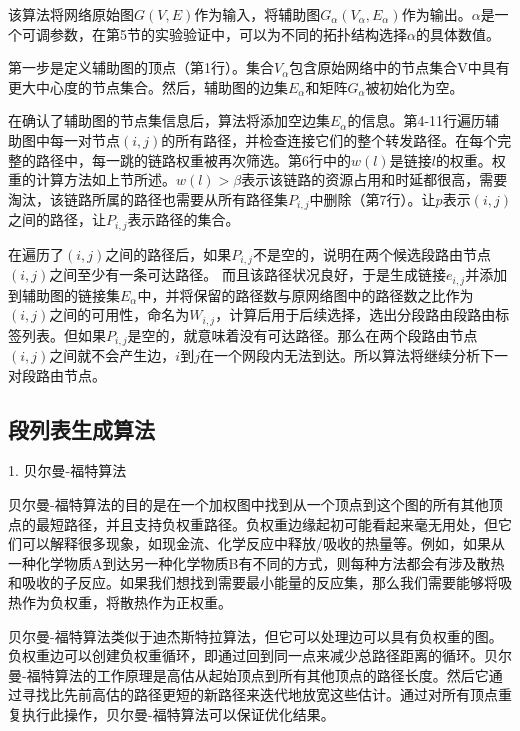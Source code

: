 该算法将网络原始图$G(V, E)$作为输入，将辅助图$G_\alpha\left(V_\alpha,E_\alpha\right)$作为输出。$\alpha$是一个可调参数，在第5节的实验验证中，可以为不同的拓扑结构选择$\alpha$的具体数值。

第一步是定义辅助图的顶点（第1行）。集合$V_\alpha$包含原始网络中的节点集合V中具有更大中心度的节点集合。然后，辅助图的边集$E_\alpha$和矩阵$G_\alpha$被初始化为空。

在确认了辅助图的节点集信息后，算法将添加空边集$E_\alpha$的信息。第4-11行遍历辅助图中每一对节点$\left(i,j\right)$的所有路径，并检查连接它们的整个转发路径。在每个完整的路径中，每一跳的链路权重被再次筛选。第6行中的$w\left(l\right)$是链接$l$的权重。权重的计算方法如上节所述。$w\left(l\right)>\beta$表示该链路的资源占用和时延都很高，需要淘汰，该链路所属的路径也需要从所有路径集$P_{i,j}$中删除（第7行）。让$p$表示$\left(i,j\right)$之间的路径，让$P_{i,j}$表示路径的集合。

在遍历了$\left(i,j\right)$之间的路径后，如果$P_{i,j}$不是空的，说明在两个候选段路由节点$\left(i,j\right)$之间至少有一条可达路径。 而且该路径状况良好，于是生成链接$e_{i,j}$并添加到辅助图的链接集$E_\alpha$中，并将保留的路径数与原网络图中的路径数之比作为$\left(i,j\right)$之间的可用性，命名为$W_{i,j}$，计算后用于后续选择，选出分段路由段路由标签列表。但如果$P_{i,j}$是空的，就意味着没有可达路径。那么在两个段路由节点$\left(i,j\right)$之间就不会产生边，$i$到$j$在一个网段内无法到达。所以算法将继续分析下一对段路由节点。

\subsection{段列表生成算法}

1. 贝尔曼-福特算法

贝尔曼-福特算法的目的是在一个加权图中找到从一个顶点到这个图的所有其他顶点的最短路径，并且支持负权重路径。负权重边缘起初可能看起来毫无用处，但它们可以解释很多现象，如现金流、化学反应中释放/吸收的热量等。例如，如果从一种化学物质A到达另一种化学物质B有不同的方式，则每种方法都会有涉及散热和吸收的子反应。如果我们想找到需要最小能量的反应集，那么我们需要能够将吸热作为负权重，将散热作为正权重。

贝尔曼-福特算法类似于迪杰斯特拉算法，但它可以处理边可以具有负权重的图。负权重边可以创建负权重循环，即通过回到同一点来减少总路径距离的循环。贝尔曼-福特算法的工作原理是高估从起始顶点到所有其他顶点的路径长度。然后它通过寻找比先前高估的路径更短的新路径来迭代地放宽这些估计。通过对所有顶点重复执行此操作，贝尔曼-福特算法可以保证优化结果。

